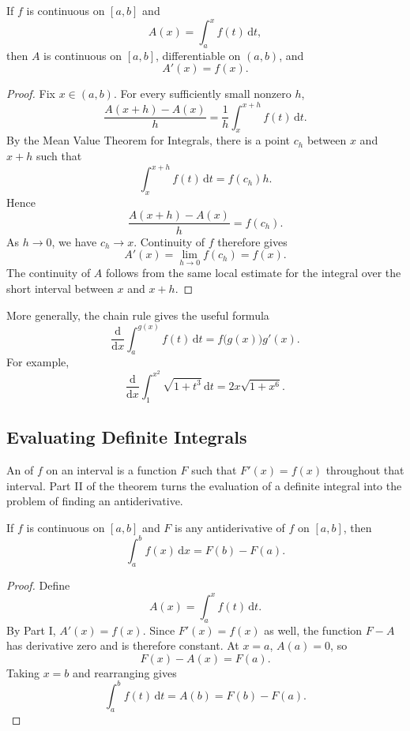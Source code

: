 \begin{theorem}
    If \(f\) is continuous on \([a,b]\) and
    \[
        A(x)=\int_a^x f(t)\,\mathrm{d}t,
    \]
    then \(A\) is continuous on \([a,b]\), differentiable on \((a,b)\), and
    \[
        A'(x)=f(x).
    \]
\end{theorem}
\begin{proof}
    Fix \(x\in(a,b)\).  For every sufficiently small nonzero \(h\),
    \[
        \frac{A(x+h)-A(x)}{h}
        =\frac{1}{h}\int_x^{x+h}f(t)\,\mathrm{d}t.
    \]
    By the Mean Value Theorem for Integrals, there is a point \(c_h\) between
    \(x\) and \(x+h\) such that
    \[
        \int_x^{x+h}f(t)\,\mathrm{d}t=f(c_h)h.
    \]
    Hence
    \[
        \frac{A(x+h)-A(x)}{h}=f(c_h).
    \]
    As \(h\to0\), we have \(c_h\to x\).  Continuity of \(f\) therefore
    gives
    \[
        A'(x)=\lim_{h\to0}f(c_h)=f(x).
    \]
    The continuity of \(A\) follows from the same local estimate for the
    integral over the short interval between \(x\) and \(x+h\).
\end{proof}

More generally, the chain rule gives the useful formula
\[
    \frac{\mathrm{d}}{\mathrm{d}x}
    \int_a^{g(x)}f(t)\,\mathrm{d}t
    =f\bigl(g(x)\bigr)g'(x).
\]
For example,
\[
    \frac{\mathrm{d}}{\mathrm{d}x}
    \int_1^{x^2}\sqrt{1+t^3}\,\mathrm{d}t
    =2x\sqrt{1+x^6}.
\]

\subsection{Evaluating Definite Integrals}

An  of \(f\) on an interval is a function \(F\) such
that \(F'(x)=f(x)\) throughout that interval.  Part II of the theorem turns
the evaluation of a definite integral into the problem of finding an
antiderivative.

\begin{theorem}
    If \(f\) is continuous on \([a,b]\) and \(F\) is any antiderivative of
    \(f\) on \([a,b]\), then
    \[
        \int_a^b f(x)\,\mathrm{d}x=F(b)-F(a).
    \]
\end{theorem}
\begin{proof}
    Define
    \[
        A(x)=\int_a^x f(t)\,\mathrm{d}t.
    \]
    By Part I, \(A'(x)=f(x)\).  Since \(F'(x)=f(x)\) as well, the function
    \(F-A\) has derivative zero and is therefore constant.  At \(x=a\),
    \(A(a)=0\), so
    \[
        F(x)-A(x)=F(a).
    \]
    Taking \(x=b\) and rearranging gives
    \[
        \int_a^b f(t)\,\mathrm{d}t=A(b)=F(b)-F(a).
    \]
\end{proof}

